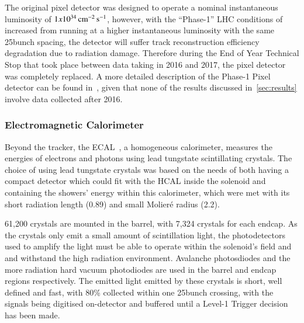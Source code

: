 The original pixel detector was designed to operate a nominal instantaneous luminosity of $1x10^{34}\,\text{cm}^\text{$-$2}\,\text{s}^\text{$-$1}$, however, with the ``Phase-1'' LHC conditions of increased \PU from running at a higher instantaneous luminosity with the same 25\ns bunch spacing, the detector will suffer track reconstruction efficiency degradation due to radiation damage.
Therefore during the End of Year Technical Stop that took place between data taking in 2016 and 2017, the pixel detector was completely replaced.
A more detailed description of the Phase-1 Pixel detector can be found in~\cite{CMS:2012sda}, given that none of the results discussed in~\ref{sec:results} involve data collected after 2016.


\subsubsection{Electromagnetic Calorimeter}\label{subsubsec:ECAL}
Beyond the tracker, the ECAL~\cite{CMS:1997ysd,CMS:2002xia}, a homogeneous calorimeter, measures the energies of electrons and photons using lead tungstate scintillating crystals. 
The choice of using lead tungstate crystals was based on the needs of both having a compact detector which could fit with the HCAL inside the solenoid and containing the showers' energy within this calorimeter, which were met with its short radiation length (0.89\cm) and small Molier\'{e} radius (2.2\cm).

61,200 crystals are mounted in the barrel, with 7,324 crystals for each endcap.
As the crystals only emit a small amount of scintillation light, the photodetectors used to amplify the light must be able to operate within the solenoid's field and and withstand the high radiation environment.
Avalanche photosdiodes and the more radiation hard vacuum photodiodes are used in the barrel and endcap regions respectively.
The emitted light emitted by these crystals is short, well defined and fast, with 80\% collected within one 25\ns bunch crossing, with the signals being digitised on-detector and buffered until a Level-1 Trigger decision has been made.

